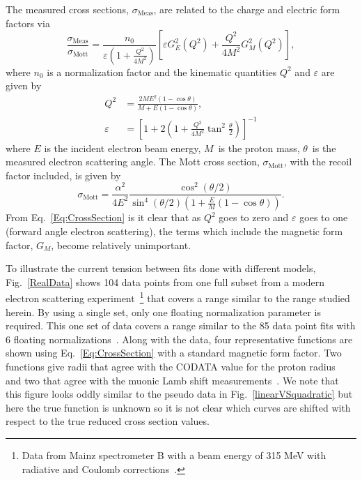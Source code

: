 \documentclass[10pt,superscriptaddress,aps,prc,twocolumn]{revtex4-1}
\begin{document}
The measured cross sections, $\sigma_{\mathrm{Meas}}$,  are related to the charge and electric form factors via 
\begin{equation}
\frac{\sigma_{\text{Meas}}}{\sigma_{\text{Mott}}} = \frac{n_0}{\varepsilon (1 + \frac{Q^2}{4M^2})} \left[\varepsilon G_E^2 (Q^2) + \frac{Q^2}{4M^2} G_M^2 (Q^2)\right],
\label{Eq:CrossSection}
\end{equation}
where $n_0$ is a normalization factor and the kinematic quantities $Q^2$ and $\varepsilon$ are given by
\begin{align}
Q^2 & = \frac{2M E^2 (1 - \cos{\theta})}{M + E (1 - \cos{\theta})}, \\
\varepsilon & = \left[1 + 2(1 + \frac{Q^2}{4M^2}  \tan^2{\frac{\theta}{2}})\right]^{-1}
\end{align}
where $E$ is the incident electron beam energy, $M$~is the proton mass, $\theta$~is the measured electron scattering angle. 
The Mott cross section, $\sigma_{\text{Mott}}$, with the recoil factor included, is given by
\begin{equation}
\sigma_{\text{Mott}}  = \frac{\alpha^2}{4 E^2} \frac{\cos^2{(\theta / 2)}}{\sin^4{(\theta / 2)} ( 1 + \frac{E}{M} (1 - \cos{\theta}))}.
\end{equation}
From Eq.~\ref{Eq:CrossSection} is it clear that as $Q^2$ goes to zero and $\varepsilon$ goes to one 
(forward angle electron scattering), 
the terms which include the  magnetic form factor, $G_M$, become relatively unimportant.

To illustrate the current tension between fits done with different models, Fig.~\ref{RealData} shows 
104 data points from one full subset from a modern electron scattering 
experiment~\footnote{Data from Mainz spectrometer B with a beam energy of 315 MeV with radiative and Coulomb corrections~\cite{Bernauer:2013tpr}.} 
that covers a range similar to the range studied herein.  By using a single set, only one floating normalization
parameter is required.
This one set of data covers a range similar to the 85 data point fits with 6 floating normalizations~\cite{Rosenfelder:1999cd,Hill:2010yb}.
Along with the data, four representative functions are shown using Eq.~\ref{Eq:CrossSection} with a standard magnetic form factor.
Two functions give radii that agree with the CODATA value for the proton
radius~\cite{Bernauer:2013tpr,Ye:2017gyb} and two that agree with the muonic Lamb shift measurements~\cite{Higinbotham:2015rja,Griffioen:2015hta}.
We note that this figure looks oddly similar to the pseudo data in Fig.~\ref{linearVSquadratic} but here the true function is unknown 
so it is not clear which curves are shifted with respect to the true reduced cross section values.
\end{document}
